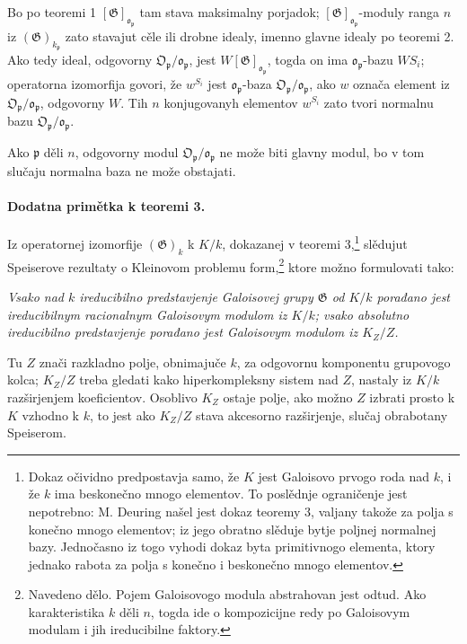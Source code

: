 \documentclass[11pt]{article}
\providecommand{\frakO}{\mathfrak{O}}
\providecommand{\frako}{\mathfrak{o}}
\providecommand{\frakp}{\mathfrak{p}}
\providecommand{\Gg}{\mathfrak{G}}
\begin{document}
Bo po teoremi 1 \([\Gg]_{\frako_\frakp}\) tam stava maksimalny porjadok; \([\Gg]_{\frako_\frakp}\)-moduly ranga \(n\) iz \((\Gg)_{k_\frakp}\) zato stavajut cěle ili drobne idealy, imenno glavne idealy po teoremi 2. Ako tedy ideal, odgovorny \(\frakO_\frakp/\frako_\frakp\), jest \(W[\Gg]_{\frako_\frakp}\), togda on ima \(\frako_\frakp\)-bazu \(WS_i\); operatorna izomorfija govori, že \(w^{S_i}\) jest \(\frako_\frakp\)-baza \(\frakO_\frakp/\frako_\frakp\), ako \(w\) označa element iz \(\frakO_\frakp/\frako_\frakp\), odgovorny \(W\). Tih \(n\) konjugovanyh elementov \(w^{S_i}\) zato tvori normalnu bazu \(\frakO_\frakp/\frako_\frakp\).

Ako \(\frakp\) děli \(n\), odgovorny modul \(\frakO_\frakp/\frako_\frakp\) ne može biti glavny modul, bo v tom slučaju normalna baza ne može obstajati.

\paragraph{Dodatna primětka k teoremi 3.}
Iz operatornej izomorfije \((\Gg)_k\) k \(K/k\), dokazanej v teoremi 3,\footnote{Dokaz očividno predpostavja samo, že \(K\) jest Galoisovo prvogo roda nad \(k\), i že \(k\) ima beskonečno mnogo elementov. To poslědnje ograničenje jest nepotrebno: M. Deuring našel jest dokaz teoremy 3, valjany takože za polja s konečno mnogo elementov; iz jego obratno slěduje bytje poljnej normalnej bazy. Jednočasno iz togo vyhodi dokaz byta primitivnogo elementa, ktory jednako rabota za polja s konečno i beskonečno mnogo elementov.} slědujut Speiserove rezultaty o Kleinovom problemu form,\footnote{Navedeno dělo. Pojem Galoisovogo modula abstrahovan jest odtud. Ako karakteristika \(k\) děli \(n\), togda ide o kompozicijne redy po Galoisovym modulam i jih ireducibilne faktory.} ktore možno formulovati tako:

\emph{Vsako nad \(k\) ireducibilno predstavjenje Galoisovej grupy \(\Gg\) od \(K/k\) porađano jest ireducibilnym racionalnym Galoisovym modulom iz \(K/k\); vsako absolutno ireducibilno predstavjenje porađano jest Galoisovym modulom iz \(K_Z/Z\).}

Tu \(Z\) znači razkladno polje, obnimajuče \(k\), za odgovornu komponentu grupovogo kolca; \(K_Z/Z\) treba gledati kako hiperkompleksny sistem nad \(Z\), nastaly iz \(K/k\) razširjenjem koeficientov. Osoblivo \(K_Z\) ostaje polje, ako možno \(Z\) izbrati prosto k \(K\) vzhodno k \(k\), to jest ako \(K_Z/Z\) stava akcesorno razširjenje, slučaj obrabotany Speiserom.
\end{document}
